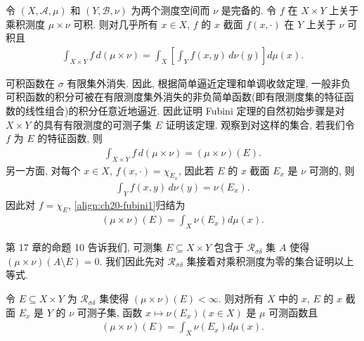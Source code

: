 \documentclass[../../main.tex]{subfiles}
\begin{document}
\begin{theorem}[Fubini 定理]\label{theorem:ch20-fubini}
令 $(X,\mathcal{A},\mu)$ 和 $(Y,\mathcal{B},\nu)$ 为两个测度空间而 $\nu$ 是完备的. 令 $f$ 在 $X\times Y$ 上关于乘积测度 $\mu\times\nu$ 可积. 则对几乎所有 $x\in X$, $f$ 的 $x$ 截面 $f(x,\cdot)$ 在 $Y$ 上关于 $\nu$ 可积且
\begin{align}\label{align:ch20-fubini1}
\int_{X\times Y}f\,d(\mu\times\nu)=\int_{X}\left[\int_{Y}f(x,y)\,d\nu(y)\right]d\mu(x).
\end{align}
\end{theorem}

可积函数在 $\sigma$ 有限集外消失. 因此, 根据简单逼近定理和单调收敛定理, 一般非负可积函数的积分可被在有限测度集外消失的非负简单函数(即有限测度集的特征函数的线性组合)的积分任意近地逼近. 因此证明 Fubini 定理的自然初始步骤是对 $X\times Y$ 的具有有限测度的可测子集 $E$ 证明该定理. 观察到对这样的集合, 若我们令 $f$ 为 $E$ 的特征函数, 则
\begin{align*}
\int_{X\times Y}f\,d(\mu\times\nu)=(\mu\times\nu)(E).
\end{align*}
另一方面, 对每个 $x\in X$, $f(x,\cdot)=\chi_{E_{x}}$, 因此若 $E$ 的 $x$ 截面 $E_{x}$ 是 $\nu$ 可测的, 则
\begin{align*}
\int_{Y}f(x,y)\,d\nu(y)=\nu(E_{x}).
\end{align*}
因此对 $f=\chi_{E}$, \eqref{align:ch20-fubini1}归结为
\begin{align*}
(\mu\times\nu)(E)=\int_{X}\nu(E_{x})d\mu(x).
\end{align*}

第 17 章的命题 10 告诉我们, 可测集 $E\subseteq X\times Y$ 包含于 $\mathcal{R}_{\sigma\delta}$ 集 $A$ 使得 $(\mu\times\nu)(A\setminus E)=0$. 我们因此先对 $\mathcal{R}_{\sigma\delta}$ 集接着对乘积测度为零的集合证明以上等式.

\begin{lemma}\label{lemma:ch20-Rsigma集截面}
令 $E\subseteq X\times Y$ 为 $\mathcal{R}_{\sigma\delta}$ 集使得 $(\mu\times\nu)(E)<\infty$. 则对所有 $X$ 中的 $x$, $E$ 的 $x$ 截面 $E_{x}$ 是 $Y$ 的 $\nu$ 可测子集, 函数 $x\mapsto\nu(E_{x})(x\in X)$ 是 $\mu$ 可测函数且
\begin{align}\label{align:ch20-截面等式}
(\mu\times\nu)(E)=\int_{X}\nu(E_{x})d\mu(x).
\end{align}
\end{lemma}
\end{document}
